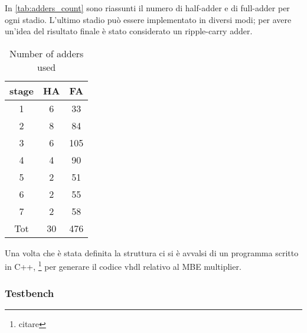 In \autoref{tab:adders_count} sono riassunti il numero di half-adder e di full-adder per ogni stadio. L'ultimo stadio può essere implementato in diversi modi; per avere un'idea del risultato finale è stato considerato un ripple-carry adder.
\begin{table}[htb!]
	\centering
	\begin{tabular}{ccc}
		stage & HA & FA \\ 
		\hline 
		1 & 6 & 33\\ 
		2 & 8 & 84\\ 
		3 & 6 & 105\\ 
		4 & 4 & 90\\ 
		5 & 2 & 51\\ 
		6 & 2 & 55\\ 
		7 & 2 & 58\\ 
		Tot & 30 & 476\\ 
	\end{tabular}  
	\label{tab:adders_count}
	\caption{Number of adders used}
\end{table}
Una volta che è stata definita la struttura ci si è avvalsi di un programma scritto in C++, \footnote{citare} per generare il codice vhdl relativo al MBE multiplier.

\subsubsection{Testbench}
